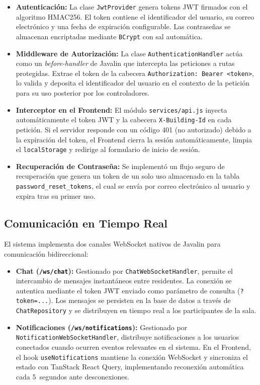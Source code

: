 \begin{itemize}
    \item \textbf{Autenticación:} La clase \texttt{JwtProvider} genera tokens JWT firmados con el algoritmo HMAC256. El token contiene el identificador del usuario, su correo electrónico y una fecha de expiración configurable. Las contraseñas se almacenan encriptadas mediante \texttt{BCrypt} con sal automática.

    \item \textbf{Middleware de Autorización:} La clase \texttt{AuthenticationHandler} actúa como un \textit{before-handler} de Javalin que intercepta las peticiones a rutas protegidas. Extrae el token de la cabecera \texttt{Authorization: Bearer <token>}, lo valida y deposita el identificador del usuario en el contexto de la petición para su uso posterior por los controladores.

    \item \textbf{Interceptor en el Frontend:} El módulo \texttt{services/api.js} inyecta automáticamente el token JWT y la cabecera \texttt{X-Building-Id} en cada petición. Si el servidor responde con un código 401 (no autorizado) debido a la expiración del token, el Frontend cierra la sesión automáticamente, limpia el \texttt{localStorage} y redirige al formulario de inicio de sesión.

    \item \textbf{Recuperación de Contraseña:} Se implementó un flujo seguro de recuperación que genera un token de un solo uso almacenado en la tabla \texttt{password\_reset\_tokens}, el cual se envía por correo electrónico al usuario y expira tras su primer uso.
\end{itemize}

\subsection{Comunicación en Tiempo Real}
El sistema implementa dos canales WebSocket nativos de Javalin para comunicación bidireccional:

\begin{itemize}
    \item \textbf{Chat (\texttt{/ws/chat}):} Gestionado por \texttt{ChatWebSocketHandler}, permite el intercambio de mensajes instantáneos entre residentes. La conexión se autentica mediante el token JWT enviado como parámetro de consulta (\texttt{?token=...}). Los mensajes se persisten en la base de datos a través de \texttt{ChatRepository} y se distribuyen en tiempo real a los participantes de la sala.

    \item \textbf{Notificaciones (\texttt{/ws/notifications}):} Gestionado por \texttt{NotificationWebSocketHandler}, distribuye notificaciones a los usuarios conectados cuando ocurren eventos relevantes en el sistema. En el Frontend, el hook \texttt{useNotifications} mantiene la conexión WebSocket y sincroniza el estado con TanStack React Query, implementando reconexión automática cada 5~segundos ante desconexiones.
\end{itemize}

